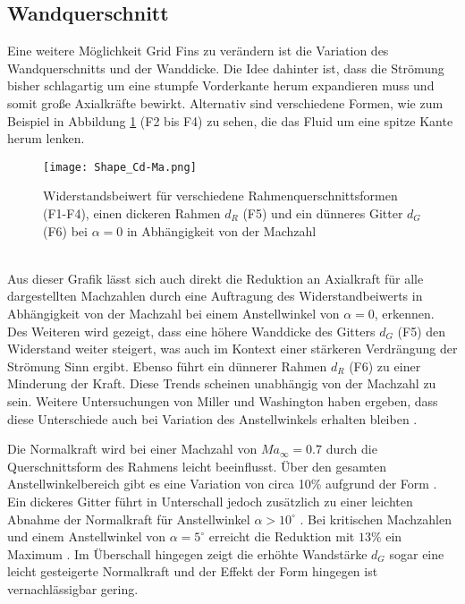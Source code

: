 \subsection{Wandquerschnitt}\label{sec_wandquerschnitt}
Eine weitere Möglichkeit Grid Fins zu verändern ist die Variation des Wandquerschnitts und der Wanddicke. Die Idee dahinter ist, dass die Strömung bisher schlagartig um eine stumpfe Vorderkante herum expandieren muss und somit große Axialkräfte bewirkt. Alternativ sind verschiedene Formen, wie zum Beispiel in Abbildung \ref{abb_Shape_Cd} (F2 bis F4) zu sehen, die das Fluid um eine spitze Kante herum lenken.
\begin{figure}[h]
	\centering
	\texttt{[image: Shape\_Cd-Ma.png]}
	\begin{flushright}
	\end{flushright}
	\caption{Widerstandsbeiwert für verschiedene Rahmenquerschnittsformen (F1-F4), einen dickeren Rahmen $d_R$ (F5) und ein dünneres Gitter $d_G$ (F6) bei $\alpha = 0$ in Abhängigkeit von der Machzahl}
	\label{abb_Shape_Cd}
\end{figure}\\
Aus dieser Grafik lässt sich auch direkt die Reduktion an Axialkraft für alle dargestellten Machzahlen durch eine Auftragung des Widerstandbeiwerts in Abhängigkeit von der Machzahl bei einem Anstellwinkel von $\alpha=0$, erkennen. Des Weiteren wird gezeigt, dass eine höhere Wanddicke des Gitters $d_G$ (F5) den Widerstand weiter steigert, was auch im Kontext einer stärkeren Verdrängung der Strömung Sinn ergibt. Ebenso führt ein dünnerer Rahmen $d_R$ (F6) zu einer Minderung der Kraft. Diese Trends scheinen unabhängig von der Machzahl zu sein. Weitere Untersuchungen von Miller und Washington haben ergeben, dass diese Unterschiede auch bei Variation des Anstellwinkels erhalten bleiben \cite{Shape}.

Die Normalkraft wird bei einer Machzahl von $Ma_\infty=0.7$ durch die Querschnittsform des Rahmens leicht beeinflusst. Über den gesamten Anstellwinkelbereich gibt es eine Variation von circa 10\% aufgrund der Form \cite{Pattern}. Ein dickeres Gitter führt in Unterschall jedoch zusätzlich zu einer leichten Abnahme der Normalkraft für Anstellwinkel $\alpha>10^\circ$ \cite{Pattern}. Bei kritischen Machzahlen und einem Anstellwinkel von $\alpha=5^\circ$ erreicht die Reduktion mit $13\%$ ein Maximum \cite{Pattern}. Im Überschall hingegen zeigt die erhöhte Wandstärke $d_G$ sogar eine leicht gesteigerte Normalkraft und der Effekt der Form hingegen ist vernachlässigbar gering.

